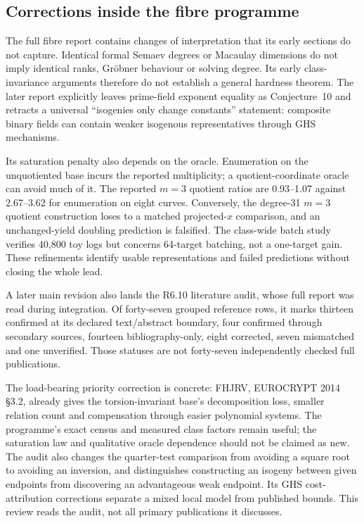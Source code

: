 \subsection{Corrections inside the fibre programme}

The full fibre report contains changes of interpretation that its early
sections do not capture. Identical formal Semaev degrees or Macaulay
dimensions do not imply identical ranks, Gr\"obner behaviour or solving
degree. Its early class-invariance arguments therefore do not establish
a general hardness theorem. The later report explicitly leaves
prime-field exponent equality as Conjecture~10 and retracts a universal
``isogenies only change constants'' statement: composite binary fields
can contain weaker isogenous representatives through GHS mechanisms.

Its saturation penalty also depends on the oracle. Enumeration on the
unquotiented base incurs the reported multiplicity; a quotient-coordinate
oracle can avoid much of it. The reported $m=3$ quotient ratios are
0.93--1.07 against 2.67--3.62 for enumeration on eight curves. Conversely,
the degree-31 $m=3$ quotient construction loses to a matched projected-$x$
comparison, and an unchanged-yield doubling prediction is falsified.
The class-wide batch study verifies 40,800 toy logs but concerns 64-target
batching, not a one-target gain. These refinements identify usable
representations and failed predictions without closing the whole lead.

A later main revision also lands the R6.10 literature audit, whose full
report was read during integration. Of forty-seven grouped reference rows,
it marks thirteen confirmed at its declared text/abstract boundary, four
confirmed through secondary sources, fourteen bibliography-only, eight
corrected, seven mismatched and one unverified. Those statuses are not
forty-seven independently checked full publications.

The load-bearing priority correction is concrete: FHJRV, EUROCRYPT 2014
\S3.2, already gives the torsion-invariant base's decomposition loss,
smaller relation count and compensation through easier polynomial systems.
The programme's exact census and measured class factors remain useful;
the saturation law and qualitative oracle dependence should not be claimed
as new. The audit also changes the quarter-test comparison from avoiding
a square root to avoiding an inversion, and distinguishes constructing an
isogeny between given endpoints from discovering an advantageous weak
endpoint. Its GHS cost-attribution corrections separate a mixed local
model from published bounds. This review reads the audit, not all primary
publications it discusses.

